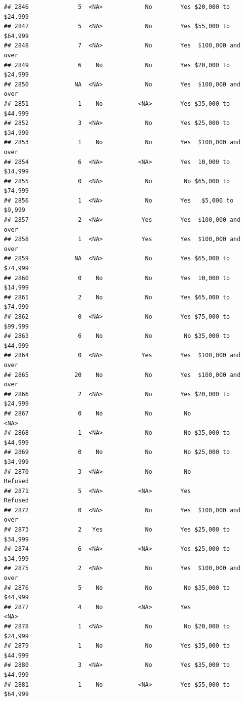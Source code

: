 \documentclass[man]{apa6}
\begin{document}
\begin{verbatim}
## 2846              5  <NA>            No        Yes $20,000 to $24,999
## 2847              5  <NA>            No        Yes $55,000 to $64,999
## 2848              7  <NA>            No        Yes  $100,000 and over
## 2849              6    No            No        Yes $20,000 to $24,999
## 2850             NA  <NA>            No        Yes  $100,000 and over
## 2851              1    No          <NA>        Yes $35,000 to $44,999
## 2852              3  <NA>            No        Yes $25,000 to $34,999
## 2853              1    No            No        Yes  $100,000 and over
## 2854              6  <NA>          <NA>        Yes  10,000 to $14,999
## 2855              0  <NA>            No         No $65,000 to $74,999
## 2856              1  <NA>            No        Yes   $5,000 to $9,999
## 2857              2  <NA>           Yes        Yes  $100,000 and over
## 2858              1  <NA>           Yes        Yes  $100,000 and over
## 2859             NA  <NA>            No        Yes $65,000 to $74,999
## 2860              0    No            No        Yes  10,000 to $14,999
## 2861              2    No            No        Yes $65,000 to $74,999
## 2862              0  <NA>            No        Yes $75,000 to $99,999
## 2863              6    No            No         No $35,000 to $44,999
## 2864              0  <NA>           Yes        Yes  $100,000 and over
## 2865             20    No            No        Yes  $100,000 and over
## 2866              2  <NA>            No        Yes $20,000 to $24,999
## 2867              0    No            No         No               <NA>
## 2868              1  <NA>            No         No $35,000 to $44,999
## 2869              0    No            No         No $25,000 to $34,999
## 2870              3  <NA>            No         No            Refused
## 2871              5  <NA>          <NA>        Yes            Refused
## 2872              0  <NA>            No        Yes  $100,000 and over
## 2873              2   Yes            No        Yes $25,000 to $34,999
## 2874              6  <NA>          <NA>        Yes $25,000 to $34,999
## 2875              2  <NA>            No        Yes  $100,000 and over
## 2876              5    No            No         No $35,000 to $44,999
## 2877              4    No          <NA>        Yes               <NA>
## 2878              1  <NA>            No         No $20,000 to $24,999
## 2879              1    No            No        Yes $35,000 to $44,999
## 2880              3  <NA>            No        Yes $35,000 to $44,999
## 2881              1    No          <NA>        Yes $55,000 to $64,999

\end{verbatim}
\end{document}
